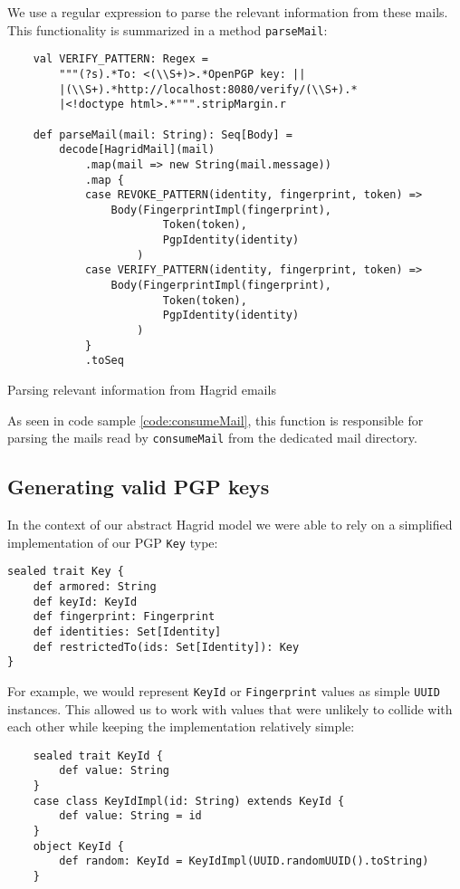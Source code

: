 We use a regular expression to parse the relevant information from these mails. This functionality is summarized in a method \texttt{parseMail}:
\begin{code}
    \begin{verbatim}
    val VERIFY_PATTERN: Regex = 
        """(?s).*To: <(\\S+)>.*OpenPGP key: ||
        |(\\S+).*http://localhost:8080/verify/(\\S+).*
        |<!doctype html>.*""".stripMargin.r

    def parseMail(mail: String): Seq[Body] =
        decode[HagridMail](mail)
            .map(mail => new String(mail.message))
            .map {
            case REVOKE_PATTERN(identity, fingerprint, token) => 
                Body(FingerprintImpl(fingerprint), 
                        Token(token), 
                        PgpIdentity(identity)
                    )
            case VERIFY_PATTERN(identity, fingerprint, token) => 
                Body(FingerprintImpl(fingerprint), 
                        Token(token), 
                        PgpIdentity(identity)
                    )
            }
            .toSeq
    \end{verbatim}
    \caption{Parsing relevant information from Hagrid emails}
\end{code}

As seen in code sample \ref{code:consumeMail}, this function is responsible for parsing the mails read by \texttt{consumeMail} from the dedicated mail directory.

\subsection{Generating valid PGP keys}
In the context of our abstract Hagrid model we were able to rely on a simplified implementation of our PGP \texttt{Key} type: 
\begin{verbatim}
sealed trait Key {
    def armored: String
    def keyId: KeyId
    def fingerprint: Fingerprint
    def identities: Set[Identity]
    def restrictedTo(ids: Set[Identity]): Key
}
\end{verbatim} 
For example, we would represent \texttt{KeyId} or \texttt{Fingerprint} values as simple \texttt{UUID} instances. This allowed us to work with values that were unlikely to collide with each other while keeping the implementation relatively simple:
\begin{verbatim}
    sealed trait KeyId {
        def value: String
    }
    case class KeyIdImpl(id: String) extends KeyId {
        def value: String = id
    }
    object KeyId {
        def random: KeyId = KeyIdImpl(UUID.randomUUID().toString)
    }
\end{verbatim}

